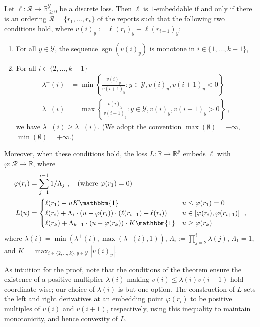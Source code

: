 \documentclass[final]{colt2020} %
\newcommand{\reals}{\mathbb{R}}
\newcommand{\nonnegreals}{\reals_{\geq 0}}%
\newcommand{\R}{\mathcal{R}}
\newcommand{\Y}{\mathcal{Y}}
\newcommand{\ones}{\mathbbm{1}}
\DeclareMathOperator*{\sgn}{sgn}
\begin{document}
\begin{theorem} \label{thm:construct-1d-loss}
  Let $\ell: \R \to \nonnegreals^{\Y}$ be a discrete loss.
  Then $\ell$ is $1$-embeddable if and only if there is an ordering $\R = \{r_1,\ldots,r_k\}$ of the reports such that the following two conditions hold, where $v(i)_y := \ell(r_i)_y - \ell(r_{i-1})_y$:
  \begin{enumerate}
  \item For all $y\in\Y$, the sequence $\sgn(v(i)_y)$ is monotone in
    $i\in\{1,\ldots,k-1\}$,
  \item For all $i\in\{2,\ldots,k-1\}$
    \begin{align*}
      \lambda^-(i) &= \min \left\{\frac{v(i)_y}{v({i+1})_y} : y\in\Y, v(i)_y, v({i+1})_y < 0\right\}
      \\
      \lambda^+(i) &= \max \left\{\frac{v(i)_y}{v({i+1})_y} : y\in\Y, v(i)_y, v({i+1})_y > 0\right\}~,
    \end{align*}
    we have $\lambda^-(i) \geq \lambda^+(i)$.
    (We adopt the convention $\max(\emptyset) = -\infty$, $\min(\emptyset) = +\infty$.)
  \end{enumerate}

  Moreover, when these conditions hold, the loss $L:\reals\to\reals^\Y$ embeds $\ell$ with $\varphi:\R\to\reals$,
  where
  \begin{align*}
    \varphi(r_i) &= \sum_{j=1}^{i-1} 1/\Lambda_j~, \quad \text{(where $\varphi(r_1)=0$)}
    \\
    L(u) &= \begin{cases}
      \ell(r_1) - u K \ones & u \leq \varphi(r_1) = 0 \\
      \ell(r_i) + \Lambda_i \cdot (u - \varphi(r_i)) \cdot  (\ell(r_{i+1})-\ell(r_i)) & u \in [\varphi(r_i),\varphi(r_{i+1})] \\
      \ell(r_k) + \Lambda_{k-1} \cdot (u - \varphi(r_k))\cdot K \ones & u \geq \varphi(r_k)
    \end{cases}~,
  \end{align*}
  where $\lambda(i) = \min(\lambda^+(i),\max(\lambda^-(i),1))$, $\Lambda_i := \prod_{j=2}^i \lambda(j)$, $\Lambda_1=1$, and $K = \max_{i\in\{2,\ldots,k\},y\in\Y} |v(i)_y|$.
\end{theorem}
As intuition for the proof, note that the conditions of the theorem ensure the existence of a positive multiplier $\lambda(i)$ making $v(i) \leq \lambda(i) v(i+1)$ hold coordinate-wise; our choice of $\lambda(i)$ is but one option.
The construction of $L$ sets the left and right derivatives at an embedding point $\varphi(r_i)$ to be positive multiples of $v(i)$ and $v(i+1)$, respectively, using this inequality to maintain monotonicity, and hence convexity of $L$.
\end{document}
